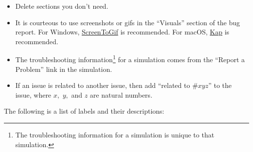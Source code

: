 \documentclass[titlepage]{article}
\begin{document}
		\begin{itemize}
			\item Delete sections you don't need.
			\item It is courteous to use screenshots or gifs in the ``Visuals'' section of the bug report. For Windows, \href{http://www.screentogif.com/}{ScreenToGif} is recommended. For macOS, \href{https://getkap.co/}{Kap} is recommended.
			\item The troubleshooting information\footnote{The troubleshooting information for a simulation is unique to that simulation.} for a simulation comes from the ``Report a Problem'' link in the simulation.
			\item If an issue is related to another issue, then add ``related to $\#xyz$'' to the issue, where $x,$ $y,$ and $z$ are natural numbers.
		\end{itemize}

The following is a list of labels and their descriptions:
\end{document}
